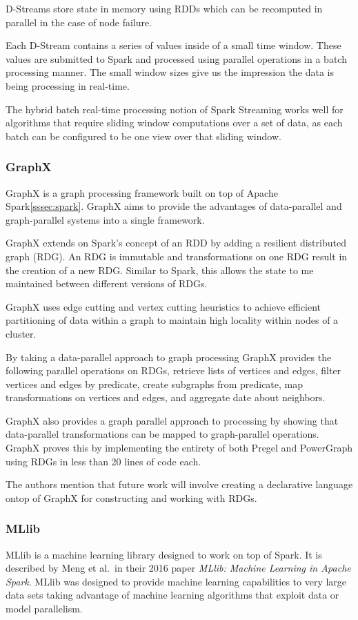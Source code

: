 \documentclass[]{article}
\begin{document}
D-Streams store state in memory using RDDs which can be recomputed in parallel in the case of node failure. 

Each D-Stream contains a series of values inside of a small time window. These values are submitted to Spark and processed using parallel operations in a batch processing manner. The small window sizes give us the impression the data is being processing in real-time.

The hybrid batch real-time processing notion of Spark Streaming works well for algorithms that require sliding window computations over a set of data, as each batch can be configured to be one view over that sliding window.

\subsubsection{GraphX}\label{sssec:graphx}
GraphX\cite{xin_graphx:_2013} is a graph processing framework built on top of Apache Spark\ref{sssec:spark}. GraphX aims to provide the advantages of data-parallel and graph-parallel systems into a single framework.

GraphX extends on Spark's concept of an RDD by adding a resilient distributed graph (RDG). An RDG is immutable and transformations on one RDG result in the creation of a new RDG. Similar to Spark, this allows the state to me maintained between different versions of RDGs.

GraphX uses edge cutting and vertex cutting heuristics to achieve efficient partitioning of data within a graph to maintain high locality within nodes of a cluster.

By taking a data-parallel approach to graph processing GraphX provides the following parallel operations on RDGs, retrieve lists of vertices and edges, filter vertices and edges by predicate, create subgraphs from predicate, map transformations on vertices and edges, and aggregate date about neighbors.

GraphX also provides a graph parallel approach to processing by showing that data-parallel transformations can be mapped to graph-parallel operations. GraphX proves this by implementing the entirety of both Pregel and PowerGraph using RDGs in less than 20 lines of code each.

The authors mention that future work will involve creating a declarative language ontop of GraphX for constructing and working with RDGs.

\subsubsection{MLlib}\label{sssec:mllib}
MLlib is a machine learning library designed to work on top of Spark. It is described by Meng et al.\ in their 2016 paper \textit{MLlib: Machine Learning in Apache Spark}\cite{meng2016mllib}. MLlib was designed to provide machine learning capabilities to very large data sets taking advantage of machine learning algorithms that exploit data or model parallelism.
\end{document}
